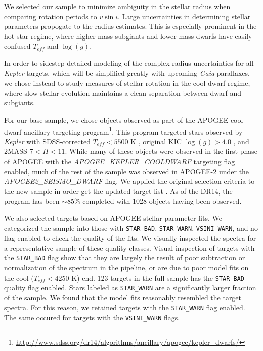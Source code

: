 \documentclass[manuscript]{aastex6}
\newcommand{\vsini}{\ensuremath{v \sin i}}
\newcommand{\Kepler}{\mbox{\textit{Kepler}}}
\newcommand{\Gaia}{\mbox{\textit{Gaia}}}
\newcommand{\Teff}{\ensuremath{T_{eff}}}
\newcommand{\logg}{\ensuremath{\log(g)}}
\newcommand{\STARBAD}{\texttt{STAR\_BAD}}
\newcommand{\STARWARN}{\texttt{STAR\_WARN}}
\newcommand{\VSINIWARN}{\texttt{VSINI\_WARN}}
\newcommand{\gvs}{\authorcomment1}
\begin{document}
We selected our sample to minimize ambiguity in the stellar radius when
comparing rotation periods to \vsini. Large uncertainties in
determining stellar parameters propogate to the radius estimates. This is 
especially prominent in the hot star regime, where higher-mass subgiants and 
lower-mass dwarfs have easily confused \Teff{} and \logg{}. 

In order to sidestep detailed modeling of the complex radius uncertainties 
for all \Kepler{} targets, which will be simplified greatly with upcoming
\Gaia{} parallaxes, we chose instead to study measures of
stellar rotation in the cool  dwarf regime, where
slow stellar evolution maintains a clean separation between dwarf and
subgiants. 

For our base sample, we chose objects observed as part of the APOGEE cool
dwarf ancillary targeting
program\footnote{\url{http://www.sdss.org/dr14/algorithms/ancillary/apogee/kepler_dwarfs/}}.
This program targeted stars observed by \Kepler{} with SDSS-corrected
\(\Teff < 5500\) K \citep{Pinsonneault12}, original KIC \(\logg > 4.0\)
\citep{Brown11}, and 2MASS \(7 < H < 11\). While many of these objects
were observed in the first phase of APOGEE with the
\textit{APOGEE\_KEPLER\_COOLDWARF} targeting flag enabled, much of the rest of
the sample was observed in APOGEE-2 under the \textit{APOGEE2\_SEISMO\_DWARF}
flag. We applied the original selection criteria to the new sample in order get
the updated target list \gvs{Use Jen's original list for this?}. As of the DR14, 
the program has been \(\sim 85\)\% completed with 1028 objects having been 
observed. 

We also selected targets based on APOGEE stellar parameter fits. We categorized the 
sample into those with \STARBAD, \STARWARN,
\VSINIWARN{}, and no flag enabled to check the quality of the fits. We
visually inspected the spectra for a representative sample of these
quality classes. 
Visual inspection of targets with the \STARBAD{} flag show that they are 
largely the result of poor subtraction or normalization of the spectrum in the
pipeline, or are due to poor model fits on the cool (\(\Teff < 4250\) K) end. 123
targets in the full sample has the \STARBAD{} quality flag enabled. 
Stars labeled as \STARWARN{} are a significantly larger fraction of the 
sample. We found that the model fits reasonably resembled the target spectra. 
For this reason, we retained targets with the \STARWARN{} flag enabled. The 
same occured for targets with the \VSINIWARN{} flags.
\end{document}
